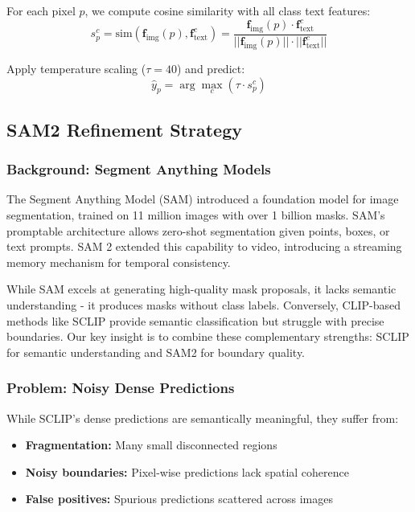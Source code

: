 For each pixel $p$, we compute cosine similarity with all class text features:
\begin{equation}
s_p^c = \text{sim}(\mathbf{f}_{\text{img}}(p), \mathbf{f}_{\text{text}}^c) = \frac{\mathbf{f}_{\text{img}}(p) \cdot \mathbf{f}_{\text{text}}^c}{||\mathbf{f}_{\text{img}}(p)|| \cdot ||\mathbf{f}_{\text{text}}^c||}
\end{equation}

Apply temperature scaling ($\tau = 40$) and predict:
\begin{equation}
\hat{y}_p = \arg\max_c \left(\tau \cdot s_p^c\right)
\end{equation}

\subsection{SAM2 Refinement Strategy}

\subsubsection{Background: Segment Anything Models}

The Segment Anything Model (SAM) \cite{kirillov2023segment} introduced a foundation model for image segmentation, trained on 11 million images with over 1 billion masks. SAM's promptable architecture allows zero-shot segmentation given points, boxes, or text prompts. SAM 2 \cite{ravi2024sam2} extended this capability to video, introducing a streaming memory mechanism for temporal consistency.

While SAM excels at generating high-quality mask proposals, it lacks semantic understanding - it produces masks without class labels. Conversely, CLIP-based methods like SCLIP provide semantic classification but struggle with precise boundaries. Our key insight is to combine these complementary strengths: SCLIP for semantic understanding and SAM2 for boundary quality.

\subsubsection{Problem: Noisy Dense Predictions}

While SCLIP's dense predictions are semantically meaningful, they suffer from:
\begin{itemize}
    \item \textbf{Fragmentation:} Many small disconnected regions
    \item \textbf{Noisy boundaries:} Pixel-wise predictions lack spatial coherence
    \item \textbf{False positives:} Spurious predictions scattered across images
\end{itemize}

